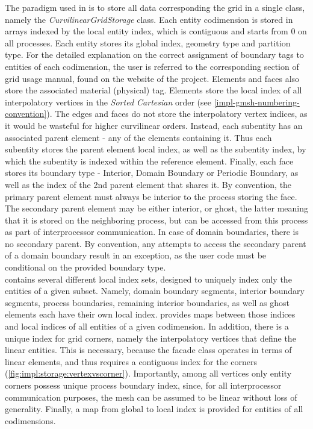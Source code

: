 \noindent
The paradigm used in \curvgrid{} is to store all data corresponding the grid in a single class, namely the \textit{CurvilinearGridStorage} class. Each entity codimension is stored in arrays indexed by the local entity index, which is contiguous and starts from 0 on all processes. Each entity stores its global index, geometry type and partition type. For the detailed explanation on the correct assignment of boundary tags to entities of each codimension, the user is referred to the corresponding section of \dune{} grid usage manual, found on the website of the project. Elements and faces also store the associated material (physical) tag. Elements store the local index of all interpolatory vertices in the \textit{Sorted Cartesian} order (see \cref{impl-gmsh-numbering-convention}). The edges and faces do not store the interpolatory vertex indices, as it would be wasteful for higher curvilinear orders. Instead, each subentity has an associated parent element - any of the elements containing it. Thus each subentity stores the parent element local index, as well as the subentity index, by which the subentity is indexed within the reference element. Finally, each face stores its boundary type - Interior, Domain Boundary or Periodic Boundary, as well as the index of the 2nd parent element that shares it. By convention, the primary parent element must always be interior to the process storing the face. The secondary parent element may be either interior, or ghost, the latter meaning that it is stored on the neighboring process, but can be accessed from this process as part of interprocessor communication. In case of domain boundaries, there is no secondary parent. By convention, any attempts to access the secondary parent of a domain boundary result in an exception, as the user code must be conditional on the provided boundary type. \\

\noindent
\curvgrid{} contains several different local index sets, designed to uniquely index only the entities of a given subset. Namely, domain boundary segments, interior boundary segments, process boundaries, remaining interior boundaries, as well as ghost elements each have their own local index. \curvgrid{} provides maps between those indices and local indices of all entities of a given codimension. In addition, there is a unique index for grid corners, namely the interpolatory vertices that define the linear entities. This is necessary, because the \dune{} facade class operates in terms of linear elements, and thus requires a contiguous index for the corners (\cref{fig:impl:storage:vertexvscorner}). Importantly, among all vertices only entity corners possess unique process boundary index, since, for all interprocessor communication purposes, the mesh can be assumed to be linear without loss of generality. Finally, a map from global to local index is provided for entities of all codimensions. \\

